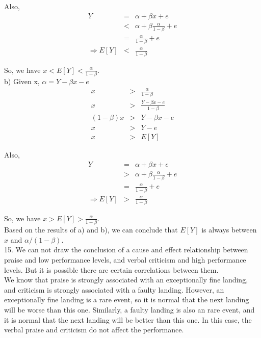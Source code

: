 \documentclass[12pt]{article}
\begin{document}
Also,
\begin{eqnarray*}
  Y &=& \alpha + \beta x + e \\
  &<& \alpha + \beta \frac {\alpha}{1 - \beta} + e \\
  &=& \frac {\alpha}{1-\beta} + e \\
  \Rightarrow E[Y] &<& \frac {\alpha}{1-\beta}
\end{eqnarray*}

So, we have $x < E[Y] < \frac {\alpha}{1 - \beta}$. \\

b) Given x, $\alpha = Y - \beta x - e$
\begin{eqnarray*}
  x &>& \frac {\alpha}{1 - \beta} \\
  x &>& \frac {Y - \beta x - e}{1 - \beta} \\
  (1 - \beta) x &>& Y - \beta x - e \\
  x &>& Y - e \\
  x &>& E[Y]
\end{eqnarray*}

Also,
\begin{eqnarray*}
  Y &=& \alpha + \beta x + e \\
  &>& \alpha + \beta \frac {\alpha}{1 - \beta} + e \\
  &=& \frac {\alpha}{1-\beta} + e \\
  \Rightarrow E[Y] &>& \frac {\alpha}{1-\beta}
\end{eqnarray*}

So, we have $x > E[Y] > \frac {\alpha}{1 - \beta}$. \\

Based on the results of a) and b), we can conclude that $E[Y]$ is always between $x$ and $\alpha / (1 - \beta)$. \\

15. We can not draw the conclusion of a cause and effect relationship between praise and low performance levels, and verbal criticism and high performance levels. But it is possible there are certain correlations between them. \\

We know that praise is strongly associated with an exceptionally fine landing, and criticism is strongly associated with a faulty landing. However, an exceptionally fine landing is a rare event, so it is normal that the next landing will be worse than this one. Similarly, a faulty landing is also an rare event, and it is normal that the next landing will be better than this one. In this case, the verbal praise and criticism do not affect the performance. \\
\end{document}
